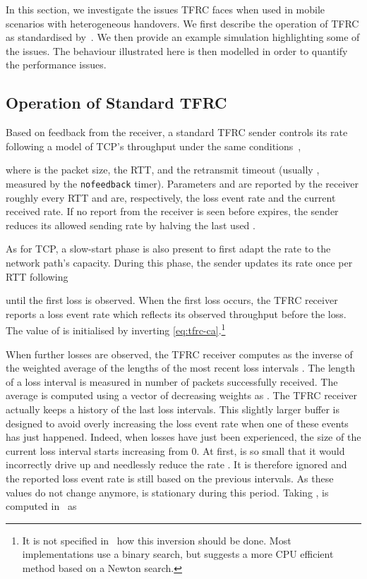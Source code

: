 \documentclass[twocolumn]{nictatechreport}
\begin{document}
In this section, we investigate the issues TFRC faces when used in mobile
scenarios with heterogeneous handovers. We first describe the operation of TFRC
as standardised by~\cite{rfc5348}.
We then provide an example simulation highlighting some of the issues.
The behaviour illustrated here  is then modelled in order to quantify the
performance issues.

\subsection{Operation of Standard TFRC}
\label{freezetfrc:standard}

Based on feedback from the receiver, a standard TFRC sender controls its rate
 following a model of TCP's throughput under the same
conditions~\cite{1998padhye_tcp_model},

where  is the packet size,  the RTT, and  the retransmit timeout
(usually , measured by the \verb#nofeedback# timer).  Parameters  and
 are reported by the receiver roughly every RTT and are,
respectively, the loss event rate and the current received rate. If no report
from the receiver is seen before  expires, the sender reduces
its allowed sending rate by halving the last used .

As for TCP, a slow-start phase is also present to first adapt the rate
to the network path's capacity. During this phase, the sender updates its rate
once per RTT following

until the first loss is observed.  When the first loss occurs, the TFRC receiver
reports a loss event rate  which reflects its observed throughput
 before the loss. The value of  is initialised by inverting
\eqref{eq:tfrc-ca}.\footnote{It is not specified in~\cite{rfc5348} how this
inversion should be done. Most implementations use a binary search, but
\cite{2007jourjon_tfrc_initialization} suggests a more CPU efficient method
based on a Newton search.}

When further losses are observed, the TFRC receiver computes  as the
inverse of the weighted average of the lengths of the  most recent loss
intervals . The length of a loss interval is measured in
number of packets successfully received. The average is computed using a vector
of decreasing weights  as .  The TFRC receiver actually keeps a history  of the last  loss intervals.  This slightly larger
buffer is designed to avoid overly increasing the loss event rate when one of
these events has just happened. Indeed, when losses have just been experienced,
the size of the current loss interval  starts increasing from 0. At first,
 is so small that it would incorrectly drive  up and needlessly reduce
the rate . It is therefore ignored and the reported loss
event rate is still based on the previous  intervals. As these
values do not change anymore,  is stationary during this period.  Taking ,  is computed in~\cite{rfc5348} as
\end{document}
